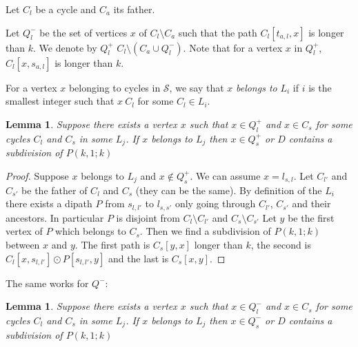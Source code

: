 \documentclass[utf8,11pt]{article}
\theoremstyle{plain}
\newtheorem{lemma}[theorem]{Lemma}
\theoremstyle{definition}
\theoremstyle{remark}
\begin{document}
Let $C_l$ be a cycle and $C_a$ its father. 

Let $Q^-_l$ be the set of vertices $x$ of $C_l \setminus C_a$ such that the path $C_l[t_{a,l}, x]$ is longer than $k$. 
We denote by $Q^+_l$ $C_l \setminus( C_a \cup Q^-_l) $. Note that for a vertex $x$ in  $Q^+_l$, $C_l[x,s_{a,l}]$ is longer than $k$. 

For a vertex $x$ belonging to cycles in $\mathcal{S}$, we say that $x$ \textit{belongs to}  $L_i$ if
$i$ is the smallest integer such that $x \ C_l$ for some $C_l \in L_i$.

\begin{lemma}\label{lem:Qpos}
Suppose there exists a vertex $x$ such that $x \in Q^+_l$ and $x \in C_s$ for some cycles $C_l$ and $C_s$ in some $L_j$.
If $x$ belongs to $L_j$ then  $x \in  Q^+_s$ or $D$ contains a subdivision of $P(k,1;k)$
\end{lemma}

\begin{proof}
Suppose $x$ belongs to $L_j$ and $x \not \in  Q^+_s$. We can assume $x = l_{s,l}$.
Let $C_{l'}$ and $C_{s'}$ be the father of $C_l$ and $C_s$ (they can be the same). 
By definition of the $L_i$ there exists a dipath $P$ from $s_{l,l'}$ to $l_{s,s'}$ only going through $C_{l'}$, $C_{s'}$ and their ancestors.
In particular $P$ is disjoint from $C_l \setminus C_{l'}$ and  $C_s \setminus C_{s'}$
Let $y$ be the first vertex of $P$ which belongs to $C_s$. Then we find a subdivision of $P(k,1;k)$ between $x$ and $y$.
The first path is $C_s[y,x]$ longer than $k$, the second is $C_l[x,s_{l,l'}] \odot P[ s_{l,l'}, y]$ and the last is $C_s[x,y]$.
\end{proof}

The same works for $Q^-$:

\begin{lemma}\label{lem:Qneg}
Suppose there exists a vertex $x$ such that $x \in Q^-_l$ and $x \in C_s$ for some cycles $C_l$ and $C_s$ in some $L_j$.
If $x$ belongs to $L_j$ then  $x \in  Q^-_s$ or $D$ contains a subdivision of $P(k,1;k)$
\end{lemma}


\end{document}
